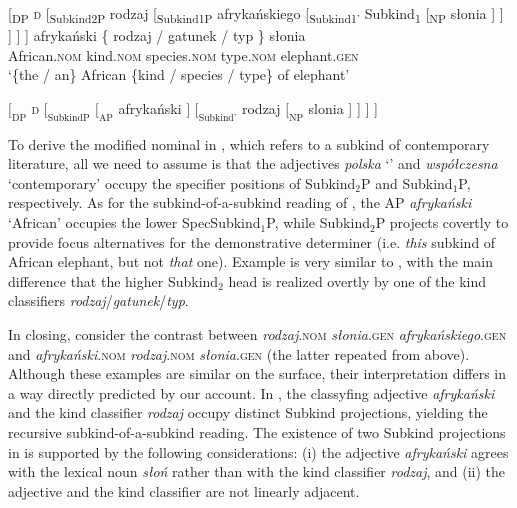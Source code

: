 \documentclass[output=paper]{langscibook}
\begin{document}
\ex
{}[\textsubscript{DP} \textsc{d} [\textsubscript{Subkind2P} rodzaj [\textsubscript{Subkind1P} afrykańskiego [\textsubscript{Subkind1'} Subkind\textsubscript{1} [\textsubscript{NP} słonia ] ] ] ] ]
\z \ex \label{ex:recursive_4}
\ea \gll
afrykański \{ rodzaj / gatunek / typ \} słonia\\
African.\textsc{nom} { } kind.\textsc{nom} { } species.\textsc{nom} { } type.\textsc{nom} { } elephant.\textsc{gen}\\
\glt `\{the / an\} African \{kind / species / type\} of elephant'

\ex $[_\text{DP}$ \textsc{d} $[_\text{SubkindP}$ $[_\text{AP}$ afrykański $]$ $[_\text{Subkind'}$ rodzaj $[_\text{NP}$ slonia ] ] ] ]
\z \z

\noindent
To derive the modified nominal in , which refers to a subkind of contemporary literature, all we need to assume is that the adjectives \textit{polska}{ }`' and \textit{współczesna}{ }`contemporary' occupy the specifier positions of Subkind$_2$P and Subkind$_1$P, respectively. As for the subkind-of-a-subkind reading of , the AP \textit{afrykański} `African' occupies the lower SpecSubkind$_1$P, while Subkind$_2$P projects covertly to provide focus alternatives for the demonstrative determiner (i.e. \textit{this} subkind of African elephant, but not \textit{that} one). Example  is very similar to , with the main difference that the higher Subkind$_2$ head is realized overtly by one of the kind classifiers \textit{rodzaj}\slash\textit{gatunek}\slash\textit{typ}.

In closing, consider the contrast between \textit{rodzaj}.\textsc{nom} \textit{słonia}.\textsc{gen} \textit{afrykańskiego}.\textsc{gen}  and \textit{afrykański}.\textsc{nom} \textit{rodzaj}.\textsc{nom} \textit{słonia}.\textsc{gen}  (the latter repeated from  above). Although these examples are similar on the surface, their interpretation differs in a way directly predicted by our account. In ,  the classyfing adjective \textit{afrykański} and the kind classifier \textit{rodzaj} occupy distinct Subkind projections, yielding the recursive subkind-of-a-subkind reading. The existence of two Subkind projections in  is supported by the following considerations: (i) the adjective \textit{afrykański} agrees with the lexical noun \textit{słoń} rather than with the kind classifier \textit{rodzaj}, and (ii) the adjective and the kind classifier are not linearly adjacent.
\end{document}
